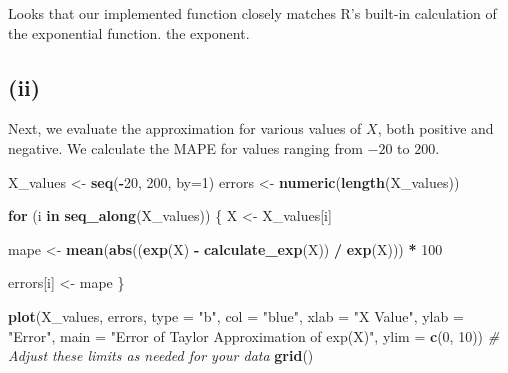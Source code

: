 \documentclass[
]{article}
\newenvironment{Shaded}{\begin{snugshade}}{\end{snugshade}}
\newcommand{\AttributeTok}[1]{\textcolor[rgb]{0.13,0.29,0.53}{#1}}
\newcommand{\CommentTok}[1]{\textcolor[rgb]{0.56,0.35,0.01}{\textit{#1}}}
\newcommand{\ControlFlowTok}[1]{\textcolor[rgb]{0.13,0.29,0.53}{\textbf{#1}}}
\newcommand{\DecValTok}[1]{\textcolor[rgb]{0.00,0.00,0.81}{#1}}
\newcommand{\FunctionTok}[1]{\textcolor[rgb]{0.13,0.29,0.53}{\textbf{#1}}}
\newcommand{\NormalTok}[1]{#1}
\newcommand{\OtherTok}[1]{\textcolor[rgb]{0.56,0.35,0.01}{#1}}
\newcommand{\SpecialCharTok}[1]{\textcolor[rgb]{0.81,0.36,0.00}{\textbf{#1}}}
\newcommand{\StringTok}[1]{\textcolor[rgb]{0.31,0.60,0.02}{#1}}
\begin{document}
Looks that our implemented function closely matches R's built-in
calculation of the exponential function. the exponent.

\subsection{(ii)}\label{ii}

Next, we evaluate the approximation for various values of \(X\), both
positive and negative. We calculate the MAPE for values ranging from
\(-20\) to \(200\).

\begin{Shaded}
\begin{Highlighting}[]
\NormalTok{X\_values }\OtherTok{\textless{}{-}} \FunctionTok{seq}\NormalTok{(}\SpecialCharTok{{-}}\DecValTok{20}\NormalTok{, }\DecValTok{200}\NormalTok{, }\AttributeTok{by=}\DecValTok{1}\NormalTok{)}
\NormalTok{errors }\OtherTok{\textless{}{-}} \FunctionTok{numeric}\NormalTok{(}\FunctionTok{length}\NormalTok{(X\_values)) }

\ControlFlowTok{for}\NormalTok{ (i }\ControlFlowTok{in} \FunctionTok{seq\_along}\NormalTok{(X\_values)) \{}
\NormalTok{  X }\OtherTok{\textless{}{-}}\NormalTok{ X\_values[i]}
  
  
\NormalTok{  mape }\OtherTok{\textless{}{-}} \FunctionTok{mean}\NormalTok{(}\FunctionTok{abs}\NormalTok{((}\FunctionTok{exp}\NormalTok{(X) }\SpecialCharTok{{-}} \FunctionTok{calculate\_exp}\NormalTok{(X)) }\SpecialCharTok{/} \FunctionTok{exp}\NormalTok{(X))) }\SpecialCharTok{*} \DecValTok{100}

  
  
\NormalTok{  errors[i] }\OtherTok{\textless{}{-}}\NormalTok{ mape  }
\NormalTok{\}}


\FunctionTok{plot}\NormalTok{(X\_values, errors, }\AttributeTok{type =} \StringTok{"b"}\NormalTok{, }\AttributeTok{col =} \StringTok{"blue"}\NormalTok{,}
     \AttributeTok{xlab =} \StringTok{"X Value"}\NormalTok{, }\AttributeTok{ylab =} \StringTok{"Error"}\NormalTok{,}
     \AttributeTok{main =} \StringTok{"Error of Taylor Approximation of exp(X)"}\NormalTok{,}
     \AttributeTok{ylim =} \FunctionTok{c}\NormalTok{(}\DecValTok{0}\NormalTok{, }\DecValTok{10}\NormalTok{))  }\CommentTok{\# Adjust these limits as needed for your data}
\FunctionTok{grid}\NormalTok{()}
\end{Highlighting}
\end{Shaded}
\end{document}
